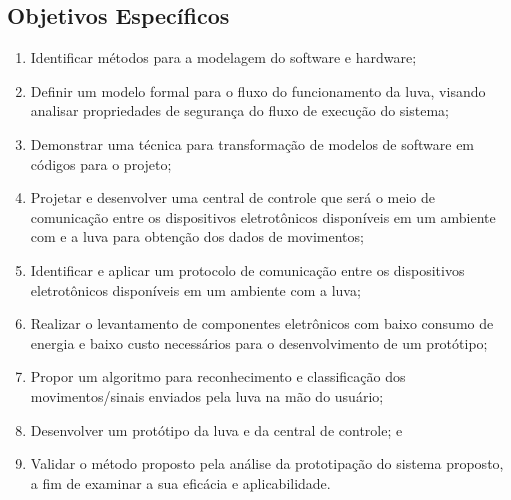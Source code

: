 \subsection{Objetivos Específicos}
\begin{enumerate}
    \item Identificar métodos para a modelagem do software e hardware;
    \item Definir um modelo formal para o fluxo do funcionamento da luva, visando analisar propriedades de segurança do fluxo de execução do sistema;
    \item Demonstrar uma técnica para transformação de modelos de software em códigos para o projeto;
    \item Projetar e desenvolver uma central de controle que será o meio de comunicação entre os dispositivos eletrotônicos disponíveis em um ambiente com e a luva para obtenção dos dados de movimentos;
    \item Identificar e aplicar um protocolo de comunicação entre os dispositivos eletrotônicos disponíveis em um ambiente com a luva;
    \item Realizar o levantamento de componentes eletrônicos com baixo consumo de energia e baixo custo necessários para o desenvolvimento de um protótipo;    
    \item Propor um algoritmo para reconhecimento e classificação dos movimentos/sinais enviados pela luva na mão do usuário;
    \item Desenvolver um protótipo da luva e da central de controle; e
    \item Validar o método proposto pela análise da prototipação do sistema proposto, a fim de examinar a sua eficácia e aplicabilidade. 
\end{enumerate}







% 
